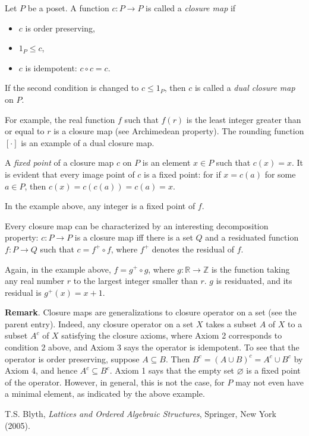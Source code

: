 \documentclass[12pt]{article}
\begin{document}
Let $P$ be a poset.  A function $c:P \to P$ is called a \emph{closure map} if
\begin{itemize}
\item $c$ is order preserving,
\item $1_P \le c$,
\item $c$ is idempotent: $c\circ c = c$.
\end{itemize}

If the second condition is changed to $c\le 1_P$, then $c$ is called a \emph{dual closure map} on $P$.

For example, the real function $f$ such that $f(r)$ is the least integer greater than or equal to $r$ is a closure map (see Archimedean property).  The rounding function $[\cdot]$ is an example of a dual closure map.

A \emph{fixed point} of a closure map $c$ on $P$ is an element $x\in P$ such that $c(x)=x$.  It is evident that every image point of $c$ is a fixed point: for if $x=c(a)$ for some $a\in P$, then $c(x)=c(c(a))=c(a)=x$.

In the example above, any integer is a fixed point of $f$.

Every closure map can be characterized by an interesting decomposition property: $c: P\to P$ is a closure map iff there is a set $Q$ and a residuated function $f: P\to Q$ such that $c=f^+\circ f$, where $f^+$ denotes the residual of $f$.

Again, in the example above, $f=g^+\circ g$, where $g: \mathbb{R}\to\mathbb{Z}$ is the function taking any real number $r$ to the largest integer smaller than $r$.  $g$ is residuated, and its residual is $g^+(x)=x+1$.

\textbf{Remark}.  Closure maps are generalizations to closure operator on a set (see the parent entry).  Indeed, any closure operator on a set $X$ takes a subset $A$ of $X$ to a subset $A^c$ of $X$ satisfying the closure axioms, where Axiom 2 corresponds to condition 2 above, and Axiom 3 says the operator is idempotent.  To see that the operator is order preserving, suppose $A\subseteq B$.  Then $B^c = (A\cup B)^c =A^c \cup B^c$ by Axiom 4, and hence $A^c\subseteq B^c$.  Axiom 1 says that the empty set $\varnothing$ is a fixed point of the operator.  However, in general, this is not the case, for $P$ may not even have a minimal element, as indicated by the above example.

\begin{thebibliography}{6}
 T.S. Blyth, {\em Lattices and Ordered Algebraic Structures}, Springer, New York (2005).
\end{thebibliography}
\end{document}
